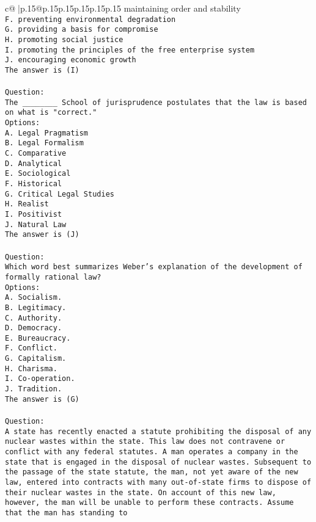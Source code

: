 \documentclass{article}
\begin{document}
{\begin{supertabular}{c@{$\;$}|p{.15\linewidth}@{}p{.15\linewidth}p{.15\linewidth}p{.15\linewidth}p{.15\linewidth}p{.15\linewidth}}
{{{maintaining order and stability\\ \tt F. preventing environmental degradation\\ \tt G. providing a basis for compromise\\ \tt H. promoting social justice\\ \tt I. promoting the principles of the free enterprise system\\ \tt J. encouraging economic growth\\ \tt The answer is (I)\\ \tt \\ \tt Question:\\ \tt The ________ School of jurisprudence postulates that the law is based on what is "correct."\\ \tt Options:\\ \tt A. Legal Pragmatism\\ \tt B. Legal Formalism\\ \tt C. Comparative\\ \tt D. Analytical\\ \tt E. Sociological\\ \tt F. Historical\\ \tt G. Critical Legal Studies\\ \tt H. Realist\\ \tt I. Positivist\\ \tt J. Natural Law\\ \tt The answer is (J)\\ \tt \\ \tt Question:\\ \tt Which word best summarizes Weber's explanation of the development of formally rational law?\\ \tt Options:\\ \tt A. Socialism.\\ \tt B. Legitimacy.\\ \tt C. Authority.\\ \tt D. Democracy.\\ \tt E. Bureaucracy.\\ \tt F. Conflict.\\ \tt G. Capitalism.\\ \tt H. Charisma.\\ \tt I. Co-operation.\\ \tt J. Tradition.\\ \tt The answer is (G)\\ \tt \\ \tt Question:\\ \tt A state has recently enacted a statute prohibiting the disposal of any nuclear wastes within the state. This law does not contravene or conflict with any federal statutes. A man operates a company in the state that is engaged in the disposal of nuclear wastes. Subsequent to the passage of the state statute, the man, not yet aware of the new law, entered into contracts with many out-of-state firms to dispose of their nuclear wastes in the state. On account of this new law, however, the man will be unable to perform these contracts. Assume that the man has standing to }}}
\end{supertabular}}
\end{document}
